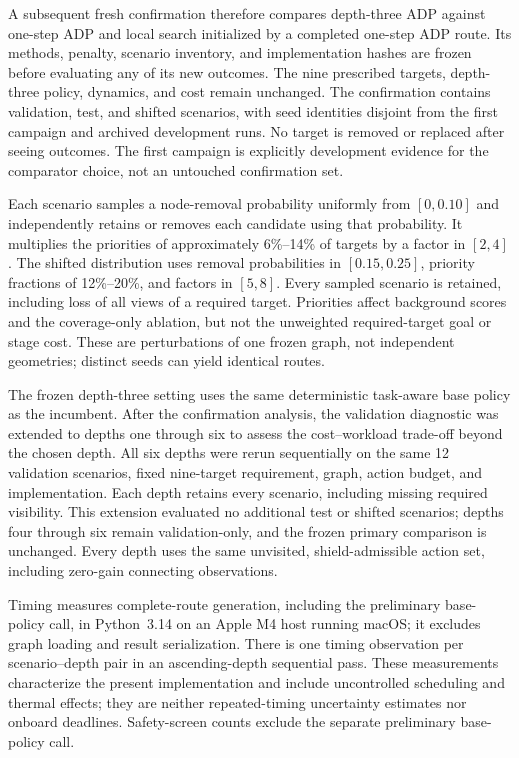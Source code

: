 A subsequent fresh confirmation therefore compares depth-three ADP against one-step ADP and local search initialized by a completed one-step ADP route. Its methods, penalty, scenario inventory, and implementation hashes are frozen before evaluating any of its new outcomes. The nine prescribed targets, depth-three policy, dynamics, and cost remain unchanged. The confirmation contains \RTValidationN{} validation, \RTTestN{} test, and \RTOodN{} shifted scenarios, with seed identities disjoint from the first campaign and archived development runs. No target is removed or replaced after seeing outcomes. The first campaign is explicitly development evidence for the comparator choice, not an untouched confirmation set.

Each scenario samples a node-removal probability uniformly from $[0,0.10]$ and independently retains or removes each candidate using that probability. It multiplies the priorities of approximately 6\%--14\% of targets by a factor in $[2,4]$. The shifted distribution uses removal probabilities in $[0.15,0.25]$, priority fractions of 12\%--20\%, and factors in $[5,8]$. Every sampled scenario is retained, including loss of all views of a required target. Priorities affect background scores and the coverage-only ablation, but not the unweighted required-target goal or stage cost. These are perturbations of one frozen graph, not independent geometries; distinct seeds can yield identical routes.

The frozen depth-three setting uses the same deterministic task-aware base policy as the incumbent. After the confirmation analysis, the validation diagnostic was extended to depths one through six to assess the cost--workload trade-off beyond the chosen depth. All six depths were rerun sequentially on the same 12 validation scenarios, fixed nine-target requirement, graph, action budget, and implementation. Each depth retains every scenario, including missing required visibility. This extension evaluated no additional test or shifted scenarios; depths four through six remain validation-only, and the frozen primary comparison is unchanged. Every depth uses the same unvisited, shield-admissible action set, including zero-gain connecting observations.

Timing measures complete-route generation, including the preliminary base-policy call, in Python~3.14 on an Apple M4 host running macOS; it excludes graph loading and result serialization. There is one timing observation per scenario--depth pair in an ascending-depth sequential pass. These measurements characterize the present implementation and include uncontrolled scheduling and thermal effects; they are neither repeated-timing uncertainty estimates nor onboard deadlines. Safety-screen counts exclude the separate preliminary base-policy call.

